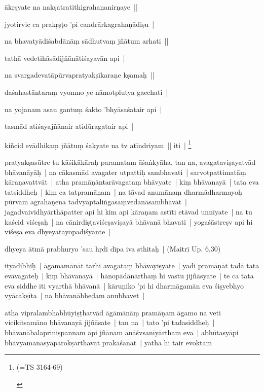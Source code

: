 \documentclass[article,a4paper]{memoir}
\begin{document}
	  \pstart ā\-kṛṣyate na nakṣatratithigrahaṇanirṇaye || 
	\pend
      

	  \pstart jyotirvic ca prakṛṣṭo 'pi candrā\-rkagrahaṇā\-diṣu | 
	\pend
      

	  \pstart na bhavatyā\-diśabdā\-nā\-ṃ sā\-dhutvaṃ jñā\-tum arhati || 
	\pend
      

	  \pstart tathā\- vedetihā\-sā\-dijñā\-nā\-tiśayavā\-n api | 
	\pend
      

	  \pstart na svargadevatā\-pū\-rvapratyakṣī\-karaṇe kṣamaḥ || 
	\pend
      

	  \pstart daśahastā\-ntaraṃ vyomno ye nā\-motplutya gacchati | 
	\pend
      

	  \pstart na yojanam asau gantuṃ śakto 'bhyā\-saśatair api | 
	\pend
      

	  \pstart tasmā\-d atiśayajñā\-nair atidū\-ragatair api | 
	\pend
      

	  \pstart kiñcid evā\-dhikaṃ jñā\-tuṃ śakyate na tv atī\-ndriyam || iti | \footnote{\begin{english}(=TS 3164-69)\end{english}}
	\pend
      

	  \pstart pratyakṣasū\-tre tu kā\-śikā\-kā\-raḥ paramatam ā\-śaṅkyā\-ha, tan na, avagataviṣayatvā\-d bhā\-vanā\-yā\-ḥ | na cā\-kasmā\-d avagater utpattiḥ sambhavati | sarvotpattimatā\-ṃ kā\-raṇavattvā\-t | atha pramā\-ṇā\-ntarā\-vagataṃ bhā\-vyate | kiṃ bhā\-vanayā\- | tata eva tatsiddheḥ | kiṃ ca tatpramā\-ṇam | na tā\-vad anumā\-naṃ dharmā\-dharmayoḥ pū\-rvam agrahaṇena tadvyā\-ptaliṅgasaṃvedanā\-sambhavā\-t | jagadvaividhyā\-rthā\-patter api hi kim api kā\-raṇam astī\-ti etā\-vad unnī\-yate | na tu kaścid viśeṣaḥ | na cā\-nirdiṣṭaviśeṣaviṣayā\- bhā\-vanā\- bhavati | yogaśā\-streṣv api hi viśeṣā\- eva dhyeyatayopadiśyante | 
	\pend
      

	  \pstart dhyeya ā\-tmā\- prabhuryo 'sau hṛdi dī\-pa iva sthitaḥ | (Maitrī\- Up. 6,30) 
	\pend
      

	  \pstart ityā\-dibhiḥ | ā\-gamamā\-nā\-t tarhi avagataṃ bhā\-vayiṣyate | yadi pramā\-ṇā\-t tadā\- tata evā\-vagateḥ | kiṃ bhā\-vanayā\- | hā\-nopā\-dā\-nā\-rthaṃ hi vastu jijñā\-syate | te ca tata eva siddhe iti vyarthā\- bhā\-vanā\- | kā\-ruṇiko 'pi hi dharmā\-gamā\-n eva śiṣyebhyo vyā\-cakṣī\-ta | na bhā\-vanā\-bhedam anubhavet | 
	\pend
      

	  \pstart atha vipralambhabhū\-yiṣṭhatvā\-d ā\-gā\-mā\-nā\-ṃ pramā\-ṇam ā\-gamo na veti vicikitsamā\-no bhā\-vanayā\- jijñā\-sate | tan na | tato 'pi tadasiddheḥ | bhā\-vanā\-balapriniṣpannam api jñā\-nam anā\-śvsanī\-yā\-rtham eva | abhū\-tasyā\-pi bhā\-vyamā\-nasyā\-parokṣā\-rthavat prakā\-śanā\-t | yathā\- hi tair evoktam 
	\pend
      
\end{document}
